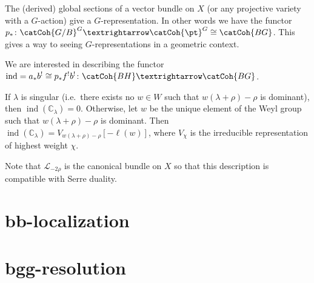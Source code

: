 \documentclass[english, no-theorem-numbers]{short-notes}
\begin{document}
The (derived) global sections of a vector bundle on $X$ (or any projective variety with a $G$-action) give a $G$-representation.
In other words we have the functor $p_*\colon \catCoh{G/B}^G → \catCoh{\pt}^G \cong \catCoh{BG}$.
This gives a way to seeing $G$-representations in a geometric context.

We are interested in describing the functor $\operatorname{ind} = a_*b^! \cong p_*f^!b^!\colon \catCoh{BH} → \catCoh{BG}$.

\begin{Thm}
    If $λ$ is singular (i.e.~there exists no $w ∈ W$ such that $w(λ+ρ)-ρ$ is dominant), then $\operatorname{ind}(ℂ_λ) = 0$.
    Otherwise, let $w$ be the unique element of the Weyl group such that $w(λ+ρ)-ρ$ is dominant.
    Then $\operatorname{ind}(ℂ_λ) = V_{w(λ+ρ)-ρ}[-\ell(w)]$, where $V_χ$ is the irreducible representation of highest weight $χ$.
\end{Thm}

Note that $\mathcal L_{-2ρ}$ is the canonical bundle on $X$ so that this description is compatible with Serre duality.

\section{bb-localization}

\section{bgg-resolution}

\printbibliography
\end{document}
